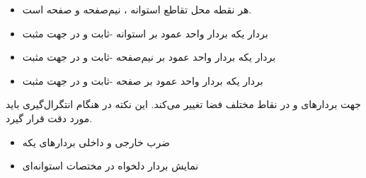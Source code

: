 \ELhold


\begin{ELunit}


\begin{itemize}
\tightlist
\item
  هر نقطه  محل تقاطع استوانه ، نیم‌صفحه  و صفحه  است.
\item
  بردار یکه  \ELim{\ELto} بردار واحد عمود بر استوانه -ثابت و در جهت مثبت
\item
  بردار یکه \ELim{\uvec{\phi}} \ELim{\ELto} بردار واحد عمود بر نیم‌صفحه \ELim{\phi}-ثابت و در جهت مثبت
\item
  بردار یکه  \ELim{\ELto} بردار واحد عمود بر صفحه -ثابت و در جهت مثبت
\end{itemize}

\end{ELunit}

\begin{ELremark}{}

جهت بردارهای  و \ELim{\uvec{\phi}} در نقاط مختلف فضا تغییر می‌کند. این نکته در هنگام انتگرال‌گیری باید مورد دقت قرار گیرد.

\end{ELremark}

\begin{ELunit}

\begin{itemize}
\tightlist
\item
  ضرب خارجی و داخلی بردارهای یکه
\end{itemize}




\end{ELunit}

\begin{ELjoin}

\begin{itemize}
\tightlist
\item
  نمایش بردار دلخواه  در مختصات استوانه‌ای
\end{itemize}

\begin{ELimportant}{}


\end{ELimportant}

\end{ELjoin}

